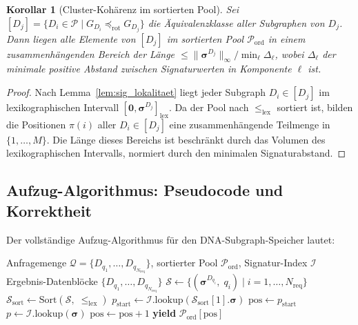 ﻿\documentclass[a4paper,12pt]{article}
\theoremstyle{definition}
\theoremstyle{plain}
\newtheorem{korollar}{Korollar}[section]
\begin{document}
\begin{korollar}[Cluster-Kohärenz im sortierten Pool]
\label{kor:cluster}
  Sei $[D_j] = \{D_i \in \mathcal{P} \mid G_{D_i} \preceq_{\mathrm{rot}} G_{D_j}\}$
  die Äquivalenzklasse aller Subgraphen von $D_j$.  Dann liegen alle
  Elemente von $[D_j]$ im sortierten Pool $\mathcal{P}_{\mathrm{ord}}$
  in einem zusammenhängenden Bereich der Länge
  $\le \|\boldsymbol{\sigma}^{D_j}\|_\infty / \min_\ell \Delta_\ell$,
  wobei $\Delta_\ell$ der minimale positive Abstand zwischen
  Signaturwerten in Komponente $\ell$ ist.
\end{korollar}

\begin{proof}
  Nach Lemma~\ref{lem:sig_lokalitaet} liegt jeder Subgraph
  $D_i \in [D_j]$ im lexikographischen Intervall
  $[\mathbf{0}, \boldsymbol{\sigma}^{D_j}]_{\mathrm{lex}}$.
  Da der Pool nach $\le_{\mathrm{lex}}$ sortiert ist, bilden die
  Positionen $\pi(i)$ aller $D_i \in [D_j]$ eine zusammenhängende
  Teilmenge in $\{1, \ldots, M\}$.  Die Länge dieses Bereichs ist
  beschränkt durch das Volumen des lexikographischen Intervalls,
  normiert durch den minimalen Signaturabstand. 
\end{proof}

\subsection{Aufzug-Algorithmus: Pseudocode und Korrektheit}
\label{ssec:elevator_algo}

Der vollständige Aufzug-Algorithmus für den DNA-Subgraph-Speicher
lautet:

\begin{algorithm}[H]
\caption{DNA-Aufzug-Retrieval}
\label{algo:elevator}
\begin{algorithmic}[1]
\Require Anfragemenge $\mathcal{Q} = \{D_{q_1}, \ldots, D_{q_{N_{\mathrm{req}}}}\}$,
         sortierter Pool $\mathcal{P}_{\mathrm{ord}}$, Signatur-Index $\mathcal{I}$
\Ensure Ergebnis-Datenblöcke $\{D_{q_1}, \ldots, D_{q_{N_{\mathrm{req}}}}\}$ 
\State $\mathcal{S} \gets \{(\boldsymbol{\sigma}^{D_{q_i}},\; q_i) \mid i = 1, \ldots, N_{\mathrm{req}}\}$
\State $\mathcal{S}_{\mathrm{sort}} \gets \mathrm{Sort}(\mathcal{S},\; \le_{\mathrm{lex}})$
\State $p_{\mathrm{start}} \gets \mathcal{I}.\mathrm{lookup}(\mathcal{S}_{\mathrm{sort}}[1].\boldsymbol{\sigma})$
\State $\mathrm{pos} \gets p_{\mathrm{start}}$
  \State $p \gets \mathcal{I}.\mathrm{lookup}(\boldsymbol{\sigma})$
    \State $\mathrm{pos} \gets \mathrm{pos} + 1$
  \EndWhile
  \State \textbf{yield} $\mathcal{P}_{\mathrm{ord}}[\mathrm{pos}]$
\EndFor
\end{algorithmic}
\end{algorithm}
\end{document}
